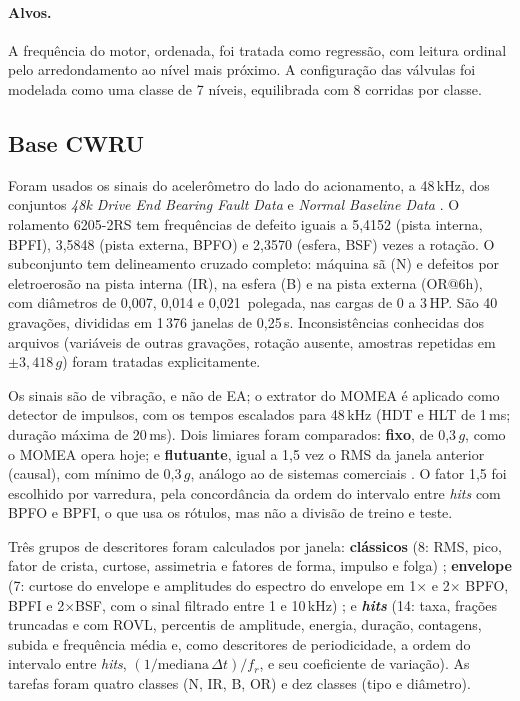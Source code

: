 \documentclass[12pt]{article}
\begin{document}
\paragraph{Alvos.} A frequência do motor, ordenada, foi tratada como regressão, com leitura ordinal pelo arredondamento ao nível mais próximo. A configuração das válvulas foi modelada como uma classe de 7 níveis, equilibrada com 8 corridas por classe.

\subsection{Base CWRU}
\label{subsec:cwru}

Foram usados os sinais do acelerômetro do lado do acionamento, a 48\,kHz, dos conjuntos \textit{48k Drive End Bearing Fault Data} e \textit{Normal Baseline Data} \cite{cwru}. O rolamento 6205-2RS tem frequências de defeito iguais a 5,4152 (pista interna, BPFI), 3,5848 (pista externa, BPFO) e 2,3570 (esfera, BSF) vezes a rotação. O subconjunto tem delineamento cruzado completo: máquina sã (N) e defeitos por eletroerosão na pista interna (IR), na esfera (B) e na pista externa (OR@6h), com diâmetros de 0,007, 0,014 e 0,021~polegada, nas cargas de 0 a 3\,HP. São 40 gravações, divididas em 1\,376 janelas de 0,25\,s. Inconsistências conhecidas dos arquivos (variáveis de outras gravações, rotação ausente, amostras repetidas em \(\pm 3{,}418\,g\)) foram tratadas explicitamente.

Os sinais são de vibração, e não de EA; o extrator do MOMEA é aplicado como detector de impulsos, com os tempos escalados para 48\,kHz (HDT e HLT de 1\,ms; duração máxima de 20\,ms). Dois limiares foram comparados: \textbf{fixo}, de 0,3\,\(g\), como o MOMEA opera hoje; e \textbf{flutuante}, igual a 1,5 vez o RMS da janela anterior (causal), com mínimo de 0,3\,\(g\), análogo ao de sistemas comerciais \cite{vallen2022}. O fator 1,5 foi escolhido por varredura, pela concordância da ordem do intervalo entre \textit{hits} com BPFO e BPFI, o que usa os rótulos, mas não a divisão de treino e teste.

Três grupos de descritores foram calculados por janela: \textbf{clássicos} (8: RMS, pico, fator de crista, curtose, assimetria e fatores de forma, impulso e folga) \cite{samanta2003}; \textbf{envelope} (7: curtose do envelope e amplitudes do espectro do envelope em 1\(\times\) e 2\(\times\) BPFO, BPFI e 2\(\times\)BSF, com o sinal filtrado entre 1 e 10\,kHz) \cite{randall2011}; e \textbf{\textit{hits}} (14: taxa, frações truncadas e com ROVL, percentis de amplitude, energia, duração, contagens, subida e frequência média e, como descritores de periodicidade, a ordem do intervalo entre \textit{hits}, \((1/\mathrm{mediana}\,\Delta t)/f_r\), e seu coeficiente de variação). As tarefas foram quatro classes (N, IR, B, OR) e dez classes (tipo e diâmetro).
\end{document}
